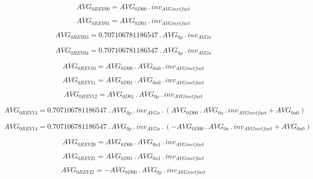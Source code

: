 \documentclass{article}
\begin{document}
\begin{dmath}AVG_{0 REV 00} = AVG_{0 D00} \,.\, inv_{AVG met fact}\end{dmath}

\begin{dmath}AVG_{0 REV 01} = AVG_{0 D01} \,.\, inv_{AVG met fact}\end{dmath}

\begin{dmath}AVG_{0 REV 03} = 0.707106781186547 \,.\, AVG_{0 \rho} \,.\, inv_{AVG a}\end{dmath}

\begin{dmath}AVG_{0 REV 04} = 0.707106781186547 \,.\, AVG_{0 \rho} \,.\, inv_{AVG a}\end{dmath}

\begin{dmath}AVG_{0 REV 10} = AVG_{0 D00} \,.\, AVG_{0 u0} \,.\, inv_{AVG met fact}\end{dmath}

\begin{dmath}AVG_{0 REV 11} = AVG_{0 D01} \,.\, AVG_{0 u0} \,.\, inv_{AVG met fact}\end{dmath}

\begin{dmath}AVG_{0 REV 12} = AVG_{0 D01} \,.\, AVG_{0 \rho} \,.\, inv_{AVG met fact}\end{dmath}

\begin{dmath}AVG_{0 REV 13} = 0.707106781186547 \,.\, AVG_{0 \rho} \,.\, inv_{AVG a} \,.\, \left(AVG_{0 D00} \,.\, AVG_{0 a} \,.\, inv_{AVG met fact} + AVG_{0 u0}\right)\end{dmath}

\begin{dmath}AVG_{0 REV 14} = 0.707106781186547 \,.\, AVG_{0 \rho} \,.\, inv_{AVG a} \,.\, \left(- AVG_{0 D00} \,.\, AVG_{0 a} \,.\, inv_{AVG met fact} + AVG_{0 u0}\right)\end{dmath}

\begin{dmath}AVG_{0 REV 20} = AVG_{0 D00} \,.\, AVG_{0 u1} \,.\, inv_{AVG met fact}\end{dmath}

\begin{dmath}AVG_{0 REV 21} = AVG_{0 D01} \,.\, AVG_{0 u1} \,.\, inv_{AVG met fact}\end{dmath}

\begin{dmath}AVG_{0 REV 22} = - AVG_{0 D00} \,.\, AVG_{0 \rho} \,.\, inv_{AVG met fact}\end{dmath}
\end{document}
